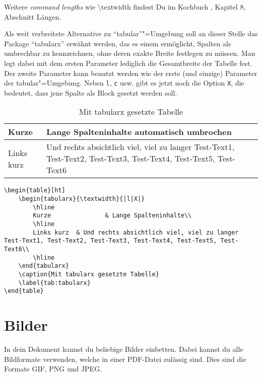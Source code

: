 Weitere \textit{command lengths} wie \textbackslash textwidth findest Du im Kochbuch \cite{Kochbuch}, Kapitel 8, Abschnitt Längen.

	Als weit verbreitete Alternative zu \enquote{tabular}"=Umgebung soll an dieser Stelle das Package \enquote{tabularx} erwähnt werden, das es einem ermöglicht, Spalten als umbrechbar zu kennzeichnen, ohne deren exakte Breite festlegen zu müssen. Man legt dabei mit dem ersten Parameter lediglich die Gesamtbreite der Tabelle fest. Der zweite Parameter kann benutzt werden wie der erste (und einzige) Parameter der tabular"=Umgebung. Neben \texttt{l}, \texttt{c} usw. gibt es jetzt noch die Option \texttt{X}, die bedeutet, dass jene Spalte als Block gesetzt werden soll.
\begin{table}[ht]
	\begin{tabularx}{\textwidth}{|l|X|}
		\hline
		Kurze				& Lange Spalteninhalte automatisch umbrochen\\
		\hline
		Links kurz	& Und rechts absichtlich viel, viel zu langer Test-Text1, Test-Text2, Test-Text3, Test-Text4, Test-Text5, Test-Text6\\
		\hline
		\end{tabularx}
	\caption{Mit tabularx gesetzte Tabelle}
	\label{tab:tabularx}
\end{table}
\begin{lstlisting}
\begin{table}[ht]	
	\begin{tabularx}{\textwidth}{|l|X|}
		\hline
		Kurze				& Lange Spalteninhalte\\
		\hline
		Links kurz	& Und rechts absichtlich viel, viel zu langer Test-Text1, Test-Text2, Test-Text3, Test-Text4, Test-Text5, Test-Text6\\
		\hline			
	\end{tabularx}
	\caption{Mit tabularx gesetzte Tabelle}
	\label{tab:tabularx}
\end{table}
\end{lstlisting}

\section{Bilder}

In dein Dokument kannst du beliebige Bilder einbetten. Dabei kannst du alle Bildformate verwenden, welche in einer PDF-Datei zulässig sind. Dies sind die Formate GIF, PNG und JPEG.

